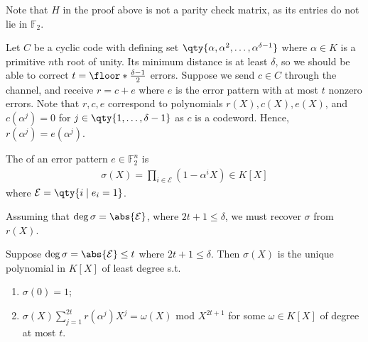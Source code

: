 Note that $H$ in the proof above is not a parity check matrix, as its entries do not lie in $\mathbb F_2$.

Let $C$ be a cyclic code with defining set $\qty{\alpha, \alpha^2, \dots, \alpha^{\delta - 1}}$ where $\alpha \in K$ is a primitive $n$th root of unity.
Its minimum distance is at least $\delta$, so we should be able to correct $t = \floor*{\frac{\delta - 1}{2}}$ errors.
Suppose we send $c \in C$ through the channel, and receive $r = c + e$ where $e$ is the error pattern with at most $t$ nonzero errors.
Note that $r, c, e$ correspond to polynomials $r(X), c(X), e(X)$, and $c(\alpha^j) = 0$ for $j \in \qty{1, \dots, \delta - 1}$ as $c$ is a codeword.
Hence, $r(\alpha^j) = e(\alpha^j)$.

\begin{definition}
    The  of an error pattern $e \in \mathbb F_2^n$ is
    \begin{align*}
        \sigma(X) = \prod_{i \in \mathcal E} (1 - \alpha^i X) \in K[X]
    \end{align*}
    where $\mathcal E = \qty{i \mid e_i = 1}$.
\end{definition}

Assuming that $\deg \sigma = \abs{\mathcal E}$, where $2t + 1 \leq \delta$, we must recover $\sigma$ from $r(X)$.

\begin{theorem}
    Suppose $\deg \sigma = \abs{\mathcal E} \leq t$ where $2t + 1 \leq \delta$.
    Then $\sigma(X)$ is the unique polynomial in $K[X]$ of least degree s.t.
    \begin{enumerate}
        \item $\sigma(0) = 1$;
        \item $\sigma(X) \sum_{j=1}^{2t} r(\alpha^j) X^j = \omega(X)$ mod $X^{2t+1}$ for some $\omega \in K[X]$ of degree at most $t$.
    \end{enumerate}
\end{theorem}

